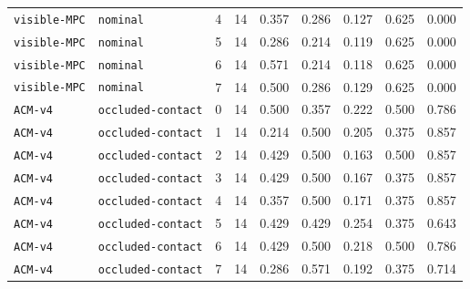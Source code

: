 \documentclass{article}
\begin{document}
\begin{center}
\begin{tabular}{llccccccc}
\texttt{visible-MPC} & \texttt{nominal} & 4 & 14 & 0.357 & 0.286 & 0.127 & 0.625 & 0.000 \\
\texttt{visible-MPC} & \texttt{nominal} & 5 & 14 & 0.286 & 0.214 & 0.119 & 0.625 & 0.000 \\
\texttt{visible-MPC} & \texttt{nominal} & 6 & 14 & 0.571 & 0.214 & 0.118 & 0.625 & 0.000 \\
\texttt{visible-MPC} & \texttt{nominal} & 7 & 14 & 0.500 & 0.286 & 0.129 & 0.625 & 0.000 \\
\texttt{ACM-v4} & \texttt{occluded-contact} & 0 & 14 & 0.500 & 0.357 & 0.222 & 0.500 & 0.786 \\
\texttt{ACM-v4} & \texttt{occluded-contact} & 1 & 14 & 0.214 & 0.500 & 0.205 & 0.375 & 0.857 \\
\texttt{ACM-v4} & \texttt{occluded-contact} & 2 & 14 & 0.429 & 0.500 & 0.163 & 0.500 & 0.857 \\
\texttt{ACM-v4} & \texttt{occluded-contact} & 3 & 14 & 0.429 & 0.500 & 0.167 & 0.375 & 0.857 \\
\texttt{ACM-v4} & \texttt{occluded-contact} & 4 & 14 & 0.357 & 0.500 & 0.171 & 0.375 & 0.857 \\
\texttt{ACM-v4} & \texttt{occluded-contact} & 5 & 14 & 0.429 & 0.429 & 0.254 & 0.375 & 0.643 \\
\texttt{ACM-v4} & \texttt{occluded-contact} & 6 & 14 & 0.429 & 0.500 & 0.218 & 0.500 & 0.786 \\
\texttt{ACM-v4} & \texttt{occluded-contact} & 7 & 14 & 0.286 & 0.571 & 0.192 & 0.375 & 0.714 \\
\bottomrule
\end{tabular}
\end{center}
\end{document}
